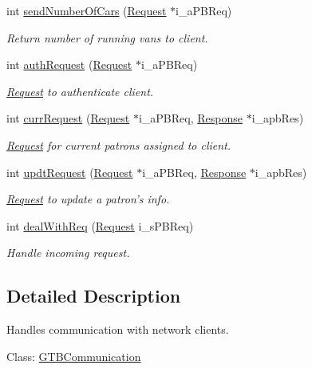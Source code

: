 \begin{DoxyCompactItemize}
int \hyperlink{classGTBCommunication_a8558ea1c9e19310b986d5ce84398ca20}{send\-Number\-Of\-Cars} (\hyperlink{classRequest}{Request} $\ast$i\-\_\-a\-P\-B\-Req)
\begin{DoxyCompactList}\small\item\em Return number of running vans to client. \end{DoxyCompactList}\item 
int \hyperlink{classGTBCommunication_aed33aec9911e0d570d4653cabd776d6b}{auth\-Request} (\hyperlink{classRequest}{Request} $\ast$i\-\_\-a\-P\-B\-Req)
\begin{DoxyCompactList}\small\item\em \hyperlink{classRequest}{Request} to authenticate client. \end{DoxyCompactList}\item 
int \hyperlink{classGTBCommunication_ae20ca3b3751720d3ef10bbdfbd4cd25a}{curr\-Request} (\hyperlink{classRequest}{Request} $\ast$i\-\_\-a\-P\-B\-Req, \hyperlink{classResponse}{Response} $\ast$i\-\_\-apb\-Res)
\begin{DoxyCompactList}\small\item\em \hyperlink{classRequest}{Request} for current patrons assigned to client. \end{DoxyCompactList}\item 
int \hyperlink{classGTBCommunication_afd6c49f0bd73a7c2014673b58c87c68b}{updt\-Request} (\hyperlink{classRequest}{Request} $\ast$i\-\_\-a\-P\-B\-Req, \hyperlink{classResponse}{Response} $\ast$i\-\_\-apb\-Res)
\begin{DoxyCompactList}\small\item\em \hyperlink{classRequest}{Request} to update a patron's info. \end{DoxyCompactList}\item 
int \hyperlink{classGTBCommunication_ac0d209ae00b1820f5f29ec7d15f418d6}{deal\-With\-Req} (\hyperlink{classRequest}{Request} i\-\_\-s\-P\-B\-Req)
\begin{DoxyCompactList}\small\item\em Handle incoming request. \end{DoxyCompactList}\end{DoxyCompactItemize}


\subsection{Detailed Description}
Handles communication with network clients. 

Class\-: \hyperlink{classGTBCommunication}{G\-T\-B\-Communication}

